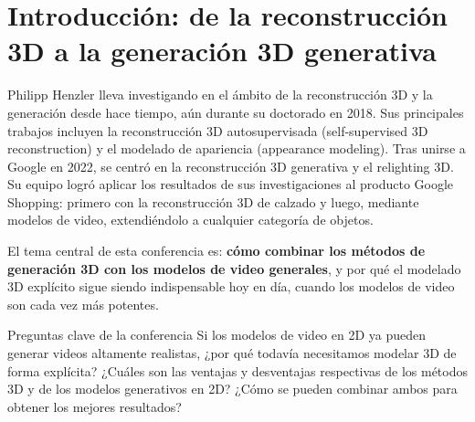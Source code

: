 \section{Introducción: de la reconstrucción 3D a la generación 3D generativa}

Philipp Henzler lleva investigando en el ámbito de la reconstrucción 3D y la generación desde hace tiempo, aún durante su doctorado en 2018. Sus principales trabajos incluyen la reconstrucción 3D autosupervisada (self-supervised 3D reconstruction) y el modelado de apariencia (appearance modeling). Tras unirse a Google en 2022, se centró en la reconstrucción 3D generativa y el relighting 3D. Su equipo logró aplicar los resultados de sus investigaciones al producto Google Shopping: primero con la reconstrucción 3D de calzado y luego, mediante modelos de video, extendiéndolo a cualquier categoría de objetos.

El tema central de esta conferencia es: \textbf{cómo combinar los métodos de generación 3D con los modelos de video generales}, y por qué el modelado 3D explícito sigue siendo indispensable hoy en día, cuando los modelos de video son cada vez más potentes.

\begin{importantbox}{Preguntas clave de la conferencia}
Si los modelos de video en 2D ya pueden generar videos altamente realistas, ¿por qué todavía necesitamos modelar 3D de forma explícita? ¿Cuáles son las ventajas y desventajas respectivas de los métodos 3D y de los modelos generativos en 2D? ¿Cómo se pueden combinar ambos para obtener los mejores resultados?
\end{importantbox}

